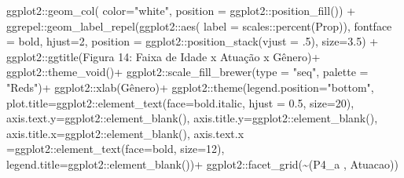 \documentclass[
]{article}
\newenvironment{Shaded}{\begin{snugshade}}{\end{snugshade}}
\newcommand{\AttributeTok}[1]{\textcolor[rgb]{0.77,0.63,0.00}{#1}}
\newcommand{\DecValTok}[1]{\textcolor[rgb]{0.00,0.00,0.81}{#1}}
\newcommand{\FloatTok}[1]{\textcolor[rgb]{0.00,0.00,0.81}{#1}}
\newcommand{\FunctionTok}[1]{\textcolor[rgb]{0.00,0.00,0.00}{#1}}
\newcommand{\NormalTok}[1]{#1}
\newcommand{\SpecialCharTok}[1]{\textcolor[rgb]{0.00,0.00,0.00}{#1}}
\newcommand{\StringTok}[1]{\textcolor[rgb]{0.31,0.60,0.02}{#1}}
\begin{document}
\begin{Shaded}
\begin{Highlighting}[]
\NormalTok{  ggplot2}\SpecialCharTok{::}\FunctionTok{geom\_col}\NormalTok{( }\AttributeTok{color=}\StringTok{"white"}\NormalTok{,}
                     \AttributeTok{position =}\NormalTok{ ggplot2}\SpecialCharTok{::}\FunctionTok{position\_fill}\NormalTok{()) }\SpecialCharTok{+}
\NormalTok{  ggrepel}\SpecialCharTok{::}\FunctionTok{geom\_label\_repel}\NormalTok{(ggplot2}\SpecialCharTok{::}\FunctionTok{aes}\NormalTok{(}
    \AttributeTok{label =}\NormalTok{ scales}\SpecialCharTok{::}\FunctionTok{percent}\NormalTok{(Prop)),}
    \AttributeTok{fontface =} \StringTok{\textquotesingle{}bold\textquotesingle{}}\NormalTok{,}
    \AttributeTok{hjust=}\DecValTok{2}\NormalTok{,}
    \AttributeTok{position =}\NormalTok{ ggplot2}\SpecialCharTok{::}\FunctionTok{position\_stack}\NormalTok{(}\AttributeTok{vjust =}\NormalTok{ .}\DecValTok{5}\NormalTok{),}
    \AttributeTok{size=}\FloatTok{3.5}\NormalTok{) }\SpecialCharTok{+}
\NormalTok{  ggplot2}\SpecialCharTok{::}\FunctionTok{ggtitle}\NormalTok{(}\StringTok{\textquotesingle{}Figura 14: Faixa de Idade x Atuação x Gênero\textquotesingle{}}\NormalTok{)}\SpecialCharTok{+}
\NormalTok{  ggplot2}\SpecialCharTok{::}\FunctionTok{theme\_void}\NormalTok{()}\SpecialCharTok{+}
\NormalTok{  ggplot2}\SpecialCharTok{::}\FunctionTok{scale\_fill\_brewer}\NormalTok{(}\AttributeTok{type =} \StringTok{"seq"}\NormalTok{, }\AttributeTok{palette =} \StringTok{"Reds"}\NormalTok{)}\SpecialCharTok{+}
\NormalTok{  ggplot2}\SpecialCharTok{::}\FunctionTok{xlab}\NormalTok{(}\StringTok{\textquotesingle{}Gênero\textquotesingle{}}\NormalTok{)}\SpecialCharTok{+}
\NormalTok{  ggplot2}\SpecialCharTok{::}\FunctionTok{theme}\NormalTok{(}\AttributeTok{legend.position=}\StringTok{"bottom"}\NormalTok{,}
                 \AttributeTok{plot.title=}\NormalTok{ggplot2}\SpecialCharTok{::}\FunctionTok{element\_text}\NormalTok{(}\AttributeTok{face=}\StringTok{\textquotesingle{}bold.italic\textquotesingle{}}\NormalTok{,}
                                                  \AttributeTok{hjust =} \FloatTok{0.5}\NormalTok{, }\AttributeTok{size=}\DecValTok{20}\NormalTok{),}
                 \AttributeTok{axis.text.y=}\NormalTok{ggplot2}\SpecialCharTok{::}\FunctionTok{element\_blank}\NormalTok{(),}
                 \AttributeTok{axis.title.y=}\NormalTok{ggplot2}\SpecialCharTok{::}\FunctionTok{element\_blank}\NormalTok{(),}
                 \AttributeTok{axis.title.x=}\NormalTok{ggplot2}\SpecialCharTok{::}\FunctionTok{element\_blank}\NormalTok{(),}
                 \AttributeTok{axis.text.x =}\NormalTok{ggplot2}\SpecialCharTok{::}\FunctionTok{element\_text}\NormalTok{(}\AttributeTok{face=}\StringTok{\textquotesingle{}bold\textquotesingle{}}\NormalTok{, }\AttributeTok{size=}\DecValTok{12}\NormalTok{),}
                 \AttributeTok{legend.title=}\NormalTok{ggplot2}\SpecialCharTok{::}\FunctionTok{element\_blank}\NormalTok{())}\SpecialCharTok{+}
\NormalTok{  ggplot2}\SpecialCharTok{::}\FunctionTok{facet\_grid}\NormalTok{(}\SpecialCharTok{\textasciitilde{}}\StringTok{\textasciigrave{}}\AttributeTok{(\textquotesingle{}P4\_a \textquotesingle{}, \textquotesingle{}Atuacao\textquotesingle{})}\StringTok{\textasciigrave{}}\NormalTok{)}
\end{Highlighting}
\end{Shaded}
\end{document}
